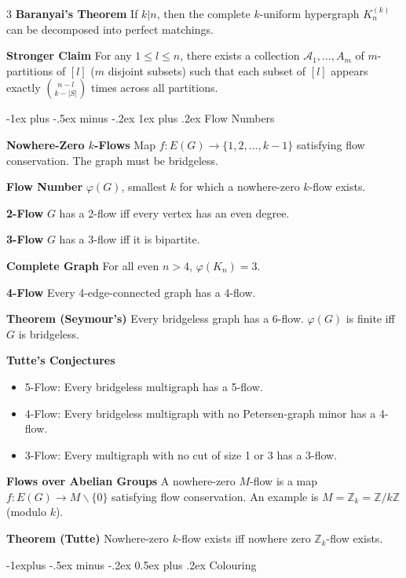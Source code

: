 \documentclass[10pt, landscape]{article}
\makeatletter
\renewcommand{\section}{\@startsection{section}{1}{0mm}%
                                {-1ex plus -.5ex minus -.2ex}%
                                {0.5ex plus .2ex}%
                                {\normalfont\large\bfseries}}
\renewcommand{\section}{\@startsection{section}{2}{0mm}%
                                {-1explus -.5ex minus -.2ex}%
                                {0.5ex plus .2ex}%
                                {\normalfont\normalsize\bfseries}}
\renewcommand{\subsection}{\@startsection{subsection}{3}{0mm}%
                                {-1ex plus -.5ex minus -.2ex}%
                                {1ex plus .2ex}%
                                {\normalfont\small\bfseries}}%
\makeatother
\begin{document}
\begin{multicols*}{3}
\textbf{Baranyai's Theorem} If $k | n$, then the complete $k$-uniform hypergraph $K_n^{(k)}$ can be decomposed into perfect matchings.

\textbf{Stronger Claim} For any $1 \leq l \leq n$, there exists a collection $\mathcal{A}_1, ..., A_m$ of $m$-partitions of $[l]$ ($m$ disjoint subsets) such that each subset of $[l]$ appears exactly ${n - l \choose k - |S|}$ times across all partitions.

\subsection{Flow Numbers}

\textbf{Nowhere-Zero $k$-Flows} Map $f:E(G) \rightarrow \{1,2,...,k-1\}$ satisfying flow conservation. The graph must be bridgeless.

\textbf{Flow Number} $\varphi(G)$, smallest $k$ for which a nowhere-zero $k$-flow exists.

\textbf{2-Flow} $G$ has a 2-flow iff every vertex has an even degree.

\textbf{3-Flow} $G$ has a 3-flow iff it is bipartite.

\textbf{Complete Graph} For all even $n>4$, $\varphi(K_n)=3$.

\textbf{4-Flow} Every 4-edge-connected graph has a 4-flow.

\textbf{Theorem (Seymour's)} Every bridgeless graph has a 6-flow. $\varphi(G)$ is finite iff $G$ is bridgeless.

\textbf{Tutte's Conjectures}
\begin{itemize}
    \item 5-Flow: Every bridgeless multigraph has a 5-flow.
    \item 4-Flow: Every bridgeless multigraph with no Petersen-graph minor has a 4-flow.
    \item 3-Flow: Every multigraph with no cut of size 1 or 3 has a 3-flow.
\end{itemize}

\textbf{Flows over Abelian Groups} A nowhere-zero $M$-flow is a map $f:E(G) \rightarrow M \backslash\{0\}$ satisfying flow conservation. An example is $M=\mathbb{Z}_k=\mathbb{Z}/ k \mathbb{Z}$ (modulo $k$).

\textbf{Theorem (Tutte)} Nowhere-zero $k$-flow exists iff nowhere zero $\mathbb{Z}_k$-flow exists.

\section{Colouring}


\end{multicols*}
\end{document}
